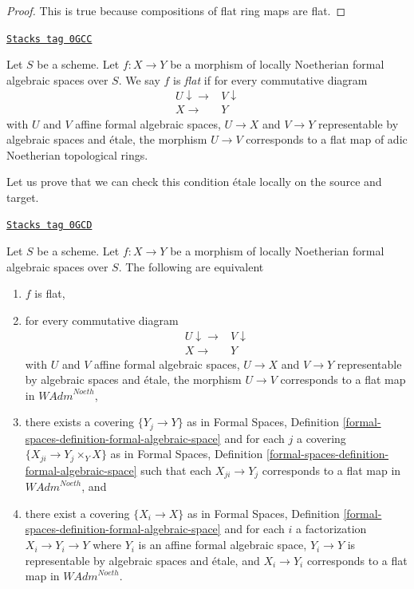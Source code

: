 \begin{proof}
This is true because compositions of flat ring maps are flat.
\end{proof}

\begin{definition}[Flat]
\label{restricted-definition-flat}
\href{https://stacks.math.columbia.edu/tag/0GCC}{\texttt{Stacks tag 0GCC}}

Let $S$ be a scheme. Let $f : X \to Y$ be a morphism of locally
Noetherian formal algebraic spaces over $S$. We say $f$ is
{\it flat} if for every commutative diagram
$$
\begin{array}{cc}U \downarrow\longrightarrow & V \downarrow \\ X \longrightarrow & Y\end{array}
$$
with $U$ and $V$ affine formal algebraic spaces, $U \to X$ and $V \to Y$
representable by algebraic spaces and \'etale, the morphism $U \to V$
corresponds to a flat map of adic Noetherian topological rings.
\end{definition}

Let us prove that we can check this condition \'etale locally on the
source and target.

\begin{lemma}
\label{restricted-lemma-flat-morphisms}
\href{https://stacks.math.columbia.edu/tag/0GCD}{\texttt{Stacks tag 0GCD}}

Let $S$ be a scheme. Let $f : X \to Y$ be a morphism of
locally Noetherian formal algebraic spaces over $S$.
The following are equivalent
\begin{enumerate}
\item $f$ is flat,
\item for every commutative diagram
$$
\begin{array}{cc}U \downarrow\longrightarrow & V \downarrow \\ X \longrightarrow & Y\end{array}
$$
with $U$ and $V$ affine formal algebraic spaces, $U \to X$ and $V \to Y$
representable by algebraic spaces and \'etale, the morphism $U \to V$
corresponds to a flat map in $\textit{WAdm}^{Noeth}$,
\item there exists a covering $\{Y_j \to Y\}$ as in
Formal Spaces,
Definition \ref{formal-spaces-definition-formal-algebraic-space}
and for each $j$
a covering $\{X_{ji} \to Y_j \times_Y X\}$ as in
Formal Spaces,
Definition \ref{formal-spaces-definition-formal-algebraic-space}
such that each $X_{ji} \to Y_j$  corresponds
to a flat map in $\textit{WAdm}^{Noeth}$, and
\item there exist a covering $\{X_i \to X\}$ as in
Formal Spaces,
Definition \ref{formal-spaces-definition-formal-algebraic-space}
and for each $i$ a factorization $X_i \to Y_i \to Y$ where $Y_i$
is an affine formal algebraic space, $Y_i \to Y$ is representable
by algebraic spaces and \'etale, and $X_i \to Y_i$ corresponds
to a flat map in $\textit{WAdm}^{Noeth}$.
\end{enumerate}
\end{lemma}

